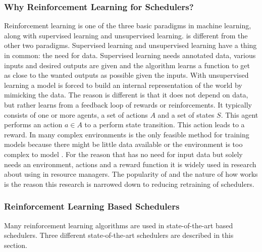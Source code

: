 

\subsubsection{Why Reinforcement Learning for Schedulers?}

Reinforcement learning is one of the three basic paradigms in machine
learning, along with supervised learning and unsupervised learning. \rl is
different from the other two paradigms. Supervised learning and unsupervised
learning have a thing in common: the need for data. Supervised learning needs
annotated data, various inputs and desired outputs are given and the algorithm
learns a function to get as close to the wanted outputs as possible given the
inputs. With unsupervised learning a model is forced to build an internal
representation of the world by mimicking the data. The reason \rl is different
is that it does not depend on data, but rather learns from a feedback loop of
rewards or reinforcements. It typically consists of one or more agents, a set
of actions $A$ and a set of states $S$. This agent performs an action $a \in
A$ to a perform state transition. This action leads to a reward. In many
complex environments \rl is the only feasible method for training models because
there might be little data available or the environment is too complex to
model \cite{russell2010}. For the reason that \rl has no need for input data
but solely needs an environment, actions and a reward function it is widely
used in research about using \ai in resource managers. The popularity of \rl
and the nature of how \rl works is the reason this research is narrowed down
to reducing retraining of \rl schedulers.


\subsubsection{Reinforcement Learning Based Schedulers}

Many reinforcement learning algorithms are used in state-of-the-art \rl
based schedulers. Three different state-of-the-art \rl schedulers are
described in this section.


